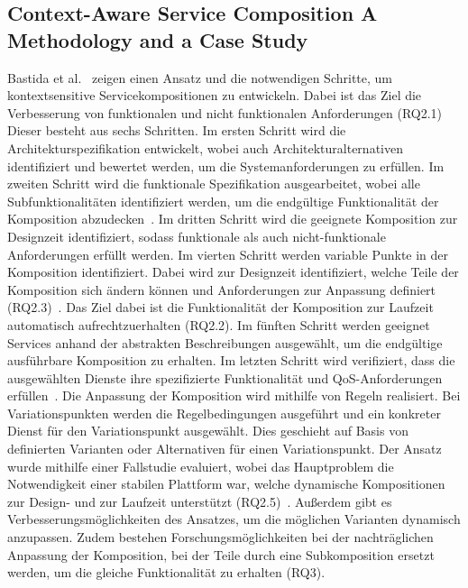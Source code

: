 \documentclass[conference,compsoc]{IEEEtran}
\begin{document}
\subsection{Context-Aware Service Composition  A Methodology and a Case Study}
Bastida et al.~\cite{bastida2008context} zeigen einen Ansatz und die notwendigen Schritte, um kontextsensitive Servicekompositionen zu entwickeln. Dabei ist das Ziel die Verbesserung von funktionalen und nicht funktionalen Anforderungen (RQ2.1) Dieser besteht aus sechs Schritten. Im ersten Schritt wird die Architekturspezifikation entwickelt, wobei auch Architekturalternativen identifiziert und bewertet werden, um die Systemanforderungen zu erfüllen. Im zweiten Schritt wird die funktionale Spezifikation ausgearbeitet, wobei alle Subfunktionalitäten identifiziert werden, um die endgültige Funktionalität der Komposition abzudecken~\cite{bastida2008context}. Im dritten Schritt wird die geeignete Komposition zur Designzeit identifiziert, sodass funktionale als auch nicht-funktionale Anforderungen erfüllt werden. Im vierten Schritt werden variable Punkte in der Komposition identifiziert. Dabei wird zur Designzeit identifiziert, welche Teile der Komposition sich ändern können und Anforderungen zur Anpassung definiert (RQ2.3)~\cite{bastida2008context}. Das Ziel dabei ist die Funktionalität der Komposition zur Laufzeit automatisch aufrechtzuerhalten (RQ2.2). Im fünften Schritt werden geeignet Services anhand der abstrakten Beschreibungen ausgewählt, um die endgültige ausführbare Komposition zu erhalten. Im letzten Schritt wird verifiziert, dass die ausgewählten Dienste ihre spezifizierte Funktionalität und QoS-Anforderungen erfüllen~\cite{bastida2008context}.
Die Anpassung der Komposition wird mithilfe von Regeln realisiert. Bei Variationspunkten werden die Regelbedingungen ausgeführt und ein konkreter Dienst für den Variationspunkt ausgewählt. Dies geschieht auf Basis von definierten Varianten oder Alternativen für einen Variationspunkt.
Der Ansatz wurde mithilfe einer Fallstudie evaluiert, wobei das Hauptproblem die Notwendigkeit einer stabilen Plattform war, welche dynamische Kompositionen zur Design- und zur Laufzeit unterstützt (RQ2.5)~\cite{bastida2008context}. Außerdem gibt es Verbesserungsmöglichkeiten des Ansatzes, um die möglichen Varianten dynamisch anzupassen. Zudem bestehen Forschungsmöglichkeiten bei der nachträglichen Anpassung der Komposition, bei der Teile durch eine Subkomposition ersetzt werden, um die gleiche Funktionalität zu erhalten (RQ3).
\end{document}
